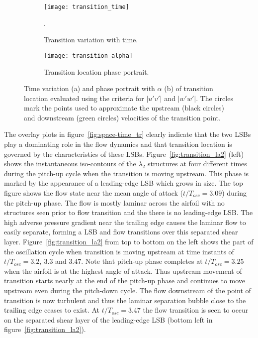 \begin{figure}[h]
	\centering
	\begin{subfigure}[t]{0.45\textwidth}
		\centering
		\texttt{[image: transition\_time]}
		\caption{Transition variation with time.}. 
		\label{fig:transition_time}
	\end{subfigure}
	\begin{subfigure}[t]{0.45\textwidth}
		\centering
		\texttt{[image: transition\_alpha]}
		\caption{Transition location phase portrait.} 
		\label{fig:transition_alpha}
	\end{subfigure}
	\caption{Time variation (a) and phase portrait with $\alpha$ (b) of transition location evaluated using the criteria for $|u'v'|$ and $|w'w'|$. The circles mark the points used to approximate the upstream (black circles) and downstream (green circles) velocities of the transition point.}
	\label{fig:transition}
\end{figure}

The overlay plots in figure~\ref{fig:space-time_tr} clearly indicate that the two LSBs play a dominating role in the flow dynamics and that transition location is governed by the characteristics of these LSBs. Figure~\ref{fig:transition_la2} (left) shows the instantaneous iso-contours of the $\lambda_{2}$ structures at four different times during the pitch-up cycle when the transition is moving upstream. This phase is marked by the appearance of a leading-edge LSB which grows in size. The top figure shows the flow state near the mean angle of attack ($t/T_{osc}=3.09$) during the pitch-up phase. The flow is mostly laminar across the airfoil with no structures seen prior to flow transition and the there is no leading-edge LSB. The high adverse pressure gradient near the trailing edge causes the laminar flow to easily separate, forming a LSB and flow transitions over this separated shear layer. Figure~\ref{fig:transition_la2} from top to bottom on the left shows the part of the oscillation cycle when transition is moving upstream at time instants of $t/T_{osc}=3.2,\ 3.3$ and $3.47$. Note that pitch-up phase completes at $t/T_{osc}=3.25$ when the airfoil is at the highest angle of attack. Thus upstream movement of transition starts nearly at the end of the pitch-up phase and continues to move upstream even during the pitch-down cycle. The flow downstream of the point of transition is now turbulent and thus the laminar separation bubble close to the trailing edge ceases to exist. At $t/T_{osc}=3.47$ the flow transition is seen to occur on the separated shear layer of the leading-edge LSB (bottom left in figure~\ref{fig:transition_la2}).

